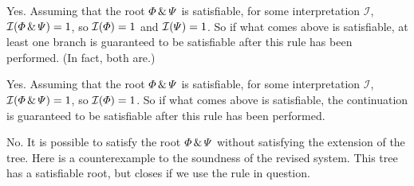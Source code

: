 
\begin{earg}

\item Yes. Assuming that the root $\varPhi{} \,\&\, \varPsi{}$ is satisfiable, for some interpretation $\mathcal{I}$, $\mathcal{I}(\varPhi{} \,\&\, \varPsi{})=1$, so $\mathcal{I}(\varPhi{})=1$ and $\mathcal{I}(\varPsi{})=1$. So if what comes above is satisfiable, at least one branch is guaranteed to be satisfiable after this rule has been performed. (In fact, both are.)

%
%


\item Yes. Assuming that the root $\varPhi{} \,\&\, \varPsi{}$ is satisfiable, for some interpretation $\mathcal{I}$, $\mathcal{I}(\varPhi{} \,\&\, \varPsi{})=1$, so $\mathcal{I}(\varPhi{})=1$. So if what comes above is satisfiable, the continuation is guaranteed to be satisfiable after this rule has been performed.


%

\item No. It is possible to satisfy the root $\varPhi{} \,\&\, \varPsi{}$ without satisfying the extension of the tree. Here is a counterexample to the soundness of the revised system. This tree has a satisfiable root, but closes if we use the rule in question.


\end{earg}
